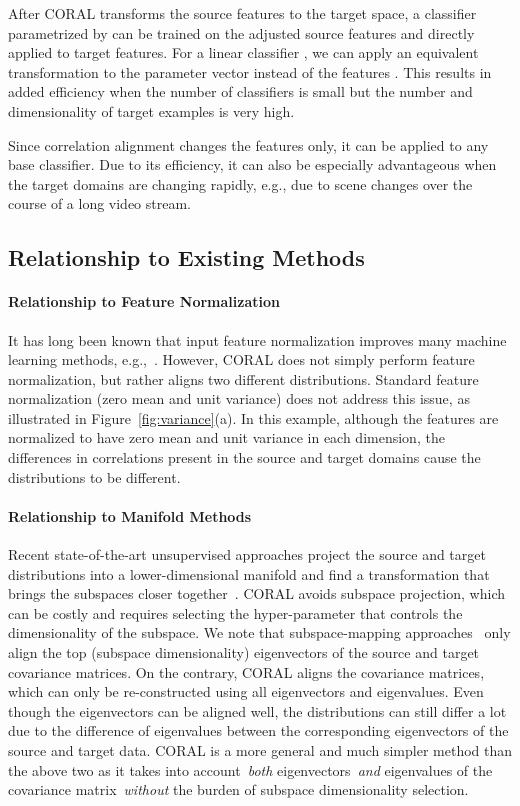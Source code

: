 \documentclass[letterpaper]{article}
\begin{document}
After CORAL transforms the source features to the target space, a classifier  parametrized by  can be trained on the adjusted source features and directly applied to target features. For a linear classifier 
,
we can apply an equivalent transformation to the parameter vector  instead of the features . This results in added efficiency when the number of classifiers is small but the number and dimensionality of target examples is very high.

Since correlation alignment changes the features only, it can be applied to any base classifier. Due to its efficiency, it can also be especially advantageous when the target domains are changing rapidly, e.g., due to scene changes over the course of a long video stream. 

\subsection{Relationship to Existing Methods}
\paragraph{Relationship to Feature Normalization} 
It has long been known that input feature normalization improves many machine learning methods, e.g.,~\cite{batchnorm}. However, CORAL does not simply perform feature normalization, but rather aligns two different distributions. Standard feature normalization (zero mean and unit variance) does not address this issue, as illustrated in Figure~\ref{fig:variance}(a). In this example, although the features are normalized to have zero mean and unit variance in each dimension, the differences in correlations present in the source and target domains cause the distributions to be different. 

\paragraph{Relationship to Manifold Methods} 
 Recent state-of-the-art unsupervised approaches project the source and target distributions into a lower-dimensional manifold and find a transformation that brings the subspaces closer together~\cite{gopalan-iccv11,gfk,sasb,outlooks}. CORAL avoids subspace projection, which can be costly and requires selecting the hyper-parameter that controls the dimensionality of the subspace. We note that subspace-mapping approaches~\cite{outlooks,sasb} only align the top  (subspace dimensionality) eigenvectors of the source and target covariance matrices. On the contrary, CORAL aligns the covariance matrices, which can only be re-constructed using all eigenvectors and eigenvalues. Even though the eigenvectors can be aligned well, the distributions can still differ a lot due to the difference of eigenvalues between the corresponding eigenvectors of the source and target data. CORAL is a more general and much simpler method than the above two as it takes into account~\emph{both} eigenvectors~\emph{and} eigenvalues of the covariance matrix~\emph{without} the burden of subspace dimensionality selection. 
\end{document}

